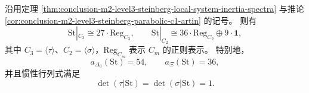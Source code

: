 \begin{corollary}\label{cor:conclusion-m2-level3-steinberg-regular-representation-rigidity}
沿用定理 \ref{thm:conclusion-m2-level3-steinberg-local-system-inertia-spectra} 与推论 \ref{cor:conclusion-m2-level3-steinberg-parabolic-c1-artin} 的记号。
则有
\[
\mathrm{St}|_{C_3}\cong 27\cdot \mathrm{Reg}_{C_3},
\qquad
\mathrm{St}|_{C_2}\cong 36\cdot \mathrm{Reg}_{C_2}\oplus 9\cdot \mathbf 1,
\]
其中 \(C_3=\langle\tau\rangle\)、\(C_2=\langle\sigma\rangle\)，\(\mathrm{Reg}_{C_m}\) 表示 \(C_m\) 的正则表示。
特别地，
\[
a_{\Delta_0}(\mathrm{St})=54,
\qquad
a_{\Xi}(\mathrm{St})=36,
\]
并且惯性行列式满足
\[
\det(\tau|\mathrm{St})=\det(\sigma|\mathrm{St})=1.
\]
\end{corollary}

